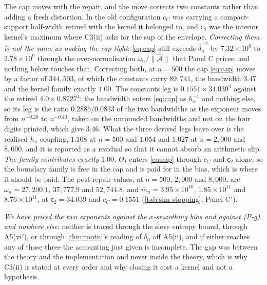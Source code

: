 \documentclass[
  12pt]{article}
\newcommand{\1}[1]{\mathds{1}\left[#1\right]}
\theoremstyle{plain}
\theoremstyle{definition}
\theoremstyle{definition}
\theoremstyle{remark}
\begin{document}
The cap moves with the repair, and the move corrects two constants rather than
adding a fresh distortion. In the old configuration $c_C$
was carrying a compact-support half-width retired with the kernel it belonged
to, and $\mathsf c_2$ was the interior kernel's maximum where C3(ii) asks for
the sup of the envelope. \emph{Correcting them is not the same as making the cap
tight}: \eqref{eq:cap} still
exceeds $\hat\delta_n^{-2}$ by $7.32\times10^{8}$ to $2.78\times10^{9}$ through
the over-normalisation $\omega_n/\|\hat{\mathcal A}\|$ that Panel C prices, and
nothing below touches that. Correcting both, at $n=500$ the cap \eqref{eq:cap} moves by a factor
of $344{,}503$, of which the constants carry $89{,}741$, the bandwidth $3.47$
and the kernel family exactly $1.00$. The constants leg is
$0.1551\times34.039^{4}$ against the retired $4.0\times0.8727^{4}$; the
bandwidth enters \eqref{eq:cap} as $h_x^{-1}$ and nothing else, so its leg is
the ratio $0.2885/0.0833$ of the two bandwidths as the exponent moves from
$n^{-0.20}$ to $n^{-0.40}$, taken on the unrounded bandwidths and not on the four
digits printed, which give $3.46$. What the three derived legs leave over is the
realised $h_u$ coupling, $1.108$ at $n=500$ and $1.054$ and $1.027$ at
$n=2{,}000$ and $8{,}000$, and it is reported as a residual so that it cannot
absorb an arithmetic slip. \emph{The family contributes exactly $1.00$.} $\Theta_I$
enters \eqref{eq:cap} through $c_C$ and $\mathsf c_2$ alone, so the boundary
family is free in the cap and is paid for in the bias, which is where it should
be paid. The post-repair values, at $n=500$, $2{,}000$ and $8{,}000$, are
$\omega_n=27{,}200.1$, $37{,}777.9$ and $52{,}744.8$, and
$\bar m_n=3.95\times10^{10}$, $1.85\times10^{11}$ and $8.76\times10^{11}$, at
$\mathsf c_2=34.039$ and $c_C=0.1551$ (\cref{tab:sim-stopping}, Panel C$'$).

\emph{We have priced the two exponents against the $x$-smoothing bias and against
(P-g) and nowhere else}: neither is traced through the sieve entropy bound,
through A5(vi$'$), or through \cref{thm:rootn}'s reading of $\delta_n$ off
A5(ii), and if either reaches any of those three the accounting just given is
incomplete. The gap was between the theory and the implementation and never
inside the theory, which is why C3(ii) is stated at every order and why closing
it cost a kernel and not a hypothesis.
\end{document}
